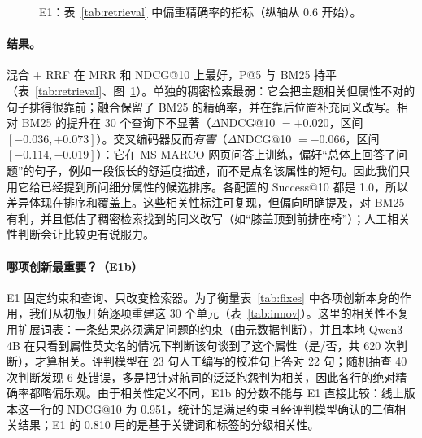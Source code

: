 \documentclass[10pt,twocolumn,a4paper]{article}
\begin{document}
\begin{figure}[t]
\centering
{}
\caption{E1：表~\ref{tab:retrieval} 中偏重精确率的指标（纵轴从 0.6 开始）。}
\label{fig:retrieval}
\end{figure}

\paragraph{结果。}混合 + RRF 在 MRR 和 NDCG@10 上最好，P@5 与 BM25 持平（表~\ref{tab:retrieval}、图~\ref{fig:retrieval}）。单独的稠密检索最弱：它会把主题相关但属性不对的句子排得很靠前；融合保留了 BM25 的精确率，并在靠后位置补充同义改写。相对 BM25 的提升在 30 个查询下不显著（$\Delta$NDCG@10 $=+0.020$，区间 $[-0.036,+0.073]$）。交叉编码器反而\emph{有害}（$\Delta$NDCG@10 $=-0.066$，区间 $[-0.114,-0.019]$）：它在 MS MARCO 网页问答上训练，偏好“总体上回答了问题”的句子，例如一段很长的舒适度描述，而不是点名该属性的短句。因此我们只用它给已经提到所问细分属性的候选排序。各配置的 Success@10 都是 1.0，所以差异体现在排序和覆盖上。这些相关性标注可复现，但偏向明确提及，对 BM25 有利，并且低估了稠密检索找到的同义改写（如“膝盖顶到前排座椅”）；人工相关性判断会让比较更有说服力。

\paragraph{哪项创新最重要？（E1b）}E1 固定约束和查询、只改变检索器。为了衡量表~\ref{tab:fixes} 中各项创新本身的作用，我们从初版开始逐项重建这 30 个单元（表~\ref{tab:innov}）。这里的相关性不复用扩展词表：一条结果必须满足问题的约束（由元数据判断），并且本地 Qwen3-4B 在只看到属性英文名的情况下判断该句谈到了这个属性（是/否，共 620 次判断），才算相关。评判模型在 23 句人工编写的校准句上答对 22 句；随机抽查 40 次判断发现 6 处错误，多是把针对航司的泛泛抱怨判为相关，因此各行的绝对精确率都略偏乐观。由于相关性定义不同，E1b 的分数不能与 E1 直接比较：线上版本这一行的 NDCG@10 为 0.951，统计的是满足约束且经评判模型确认的二值相关结果；E1 的 0.810 用的是基于关键词和标签的分级相关性。
\end{document}
